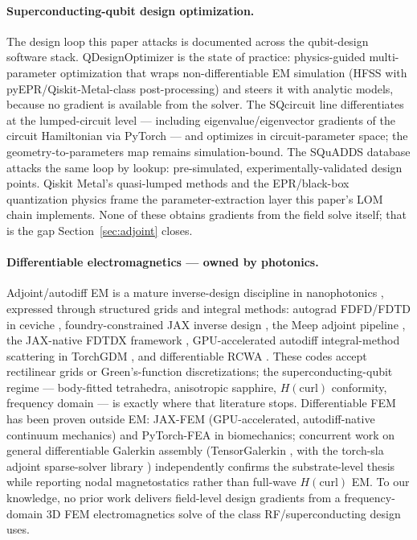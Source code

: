 \documentclass{anvil-paper}
\begin{document}
\paragraph{Superconducting-qubit design optimization.}
The design loop this paper attacks is documented across the qubit-design
software stack. QDesignOptimizer \citep{eriksson2025automated} is the
state of practice: physics-guided multi-parameter optimization that
wraps non-differentiable EM simulation (HFSS with pyEPR/Qiskit-Metal-class
post-processing) and steers it with analytic models, because no gradient
is available from the solver. The SQcircuit line
\citep{rajabzadeh2023analysis,rajabzadeh2024general} differentiates at
the lumped-circuit level --- including eigenvalue/eigenvector gradients
of the circuit Hamiltonian via PyTorch --- and optimizes in circuit-parameter
space; the geometry-to-parameters map remains simulation-bound. The
SQuADDS database \citep{shanto2024squadds} attacks the same loop by
lookup: pre-simulated, experimentally-validated design points. Qiskit
Metal's quasi-lumped methods \citep{minev2021circuit} and the
EPR/black-box quantization physics
\citep{koch2007,nigg2012,minev2021} frame the parameter-extraction layer
this paper's LOM chain implements. None of these obtains gradients from
the field solve itself; that is the gap Section~\ref{sec:adjoint} closes.

\paragraph{Differentiable electromagnetics --- owned by photonics.}
Adjoint/autodiff EM is a mature inverse-design discipline in
nanophotonics \citep{molesky2018inverse}, expressed through structured
grids and integral methods: autograd FDFD/FDTD in ceviche
\citep{hughes2019forward}, foundry-constrained JAX inverse design
\citep{schubert2022inverse}, the Meep adjoint pipeline
\citep{hammond2022high}, the JAX-native FDTDX framework
\citep{mahlau2026fdtdx}, GPU-accelerated autodiff integral-method
scattering in TorchGDM \citep{ponomareva2025torchgdm}, and
differentiable RCWA \citep{kim2024meent}. These codes accept rectilinear
grids or Green's-function discretizations; the superconducting-qubit
regime --- body-fitted tetrahedra, anisotropic sapphire,
$H(\mathrm{curl})$ conformity, frequency domain --- is exactly where that
literature stops. Differentiable FEM has been proven outside EM: JAX-FEM
\citep{xue2023jax} (GPU-accelerated, autodiff-native continuum mechanics)
and PyTorch-FEA \citep{liang2023pytorch} in biomechanics; concurrent work
on general differentiable Galerkin assembly (TensorGalerkin
\citep{wen2026learning}, with the torch-sla adjoint sparse-solver library
\citep{chi2026torch}) independently confirms the substrate-level thesis
while reporting nodal magnetostatics rather than full-wave
$H(\mathrm{curl})$ EM. To our knowledge, no prior work delivers
field-level design gradients from a frequency-domain 3D FEM
electromagnetics solve of the class RF/superconducting design uses.
\end{document}
